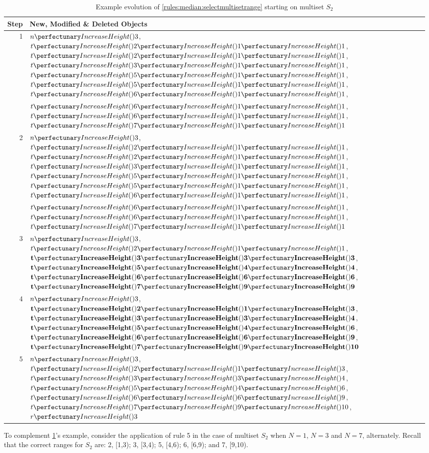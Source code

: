 \begin{table}[htbp]
\centering
   \begin{tabular}{|r|l|}
    \hline
    \textbf{Step} & \textbf{New, Modified \& Deleted Objects} \\ \hline
    1 & \(\cpfunc{n}{3}\), \(\cpfuncnn{t}{2}{1}{1}\), \(\cpfuncnn{t}{2}{1}{1}\), \(\cpfuncnn{t}{3}{1}{1}\), \(\cpfuncnn{t}{5}{1}{1}\), \(\cpfuncnn{t}{5}{1}{1}\), \(\cpfuncnn{t}{6}{1}{1}\),\\& \(\cpfuncnn{t}{6}{1}{1}\), \(\cpfuncnn{t}{6}{1}{1}\), \(\cpfuncnn{t}{7}{1}{1}\)\\ \hline
    
    2 & \(\cpfunc{n}{3}\), \(\cpfuncnn{t}{2}{1}{1}\), \sout{\(\cpfuncnn{t}{2}{1}{1}\)}, \(\cpfuncnn{t}{3}{1}{1}\), \(\cpfuncnn{t}{5}{1}{1}\), \sout{\(\cpfuncnn{t}{5}{1}{1}\)}, \(\cpfuncnn{t}{6}{1}{1}\),\\& \sout{\(\cpfuncnn{t}{6}{1}{1}\)}, \sout{\(\cpfuncnn{t}{6}{1}{1}\)}, \(\cpfuncnn{t}{7}{1}{1}\)\\ \hline
    
    3 & \(\cpfunc{n}{3}\), \(\cpfuncnn{t}{2}{1}{1}\), \(\mathbf{\cpfuncnn{t}{3}{3}{3}}\), \(\mathbf{\cpfuncnn{t}{5}{4}{4}}\), \(\mathbf{\cpfuncnn{t}{6}{6}{6}}\), \(\mathbf{\cpfuncnn{t}{7}{9}{9}}\)\\ \hline
    
    4 & \(\cpfunc{n}{3}\), \(\mathbf{\cpfuncnn{t}{2}{1}{3}}\), \(\mathbf{\cpfuncnn{t}{3}{3}{4}}\), \(\mathbf{\cpfuncnn{t}{5}{4}{6}}\), \(\mathbf{\cpfuncnn{t}{6}{6}{9}}\), \(\mathbf{\cpfuncnn{t}{7}{9}{10}}\)\\ \hline
    
    5 & \(\cpfunc{n}{3}\), \(\cpfuncnn{t}{2}{1}{3}\), \(\cpfuncnn{t}{3}{3}{4}\), \(\cpfuncnn{t}{5}{4}{6}\), \(\cpfuncnn{t}{6}{6}{9}\), \(\cpfuncnn{t}{7}{9}{10}\), \(\cpfunc{r}{3}\)\\ \hline
\end{tabular} 
\caption[Example evolution of \cref{rules:median:selectmultisetrange}]{\label{tab:median:selectmultisetrange}Example evolution of \cref{rules:median:selectmultisetrange} starting on multiset \(S_2\)}
\end{table}

To complement \cref{tab:median:selectmultisetrange}'s example, consider the application of rule 5 in the case of multiset \(S_2\) when \(N = 1\), \(N = 3\) and \(N = 7\), alternately.  Recall that the correct ranges for \(S_2\) are:  2, [1,3); 3, [3,4); 5, [4,6); 6, [6,9); and 7, [9,10).

